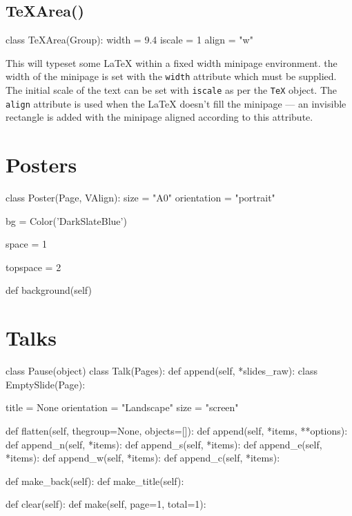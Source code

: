 \subsection{TeXArea()}
\begin{python}
class  TeXArea(Group):
    width = 9.4
    iscale = 1
    align = "w"
\end{python}
    
This will typeset some \LaTeX{} within a fixed width minipage environment.
the width of the minipage is set with the \Verb|width| attribute which must
be supplied. The initial scale of the text can be set with \Verb|iscale| as
per the \Verb|TeX| object. The \Verb|align| attribute is used when the
\LaTeX{} doesn't fill the minipage --- an invisible rectangle is added with
the minipage aligned according to this attribute.

\section{Posters}

\begin{python}
class Poster(Page, VAlign):
    size = "A0"
    orientation = "portrait"

    bg = Color('DarkSlateBlue')

    space = 1

    topspace = 2
	
    def background(self)
\end{python}


\section{Talks}


\begin{python}
class Pause(object)
class Talk(Pages):
    def append(self, *slides_raw):
class EmptySlide(Page):

    title = None
    orientation = "Landscape"
    size = "screen"

    def flatten(self, thegroup=None, objects=[]):
    def append(self, *items, **options):
    def append_n(self, *items):
    def append_s(self, *items):
    def append_e(self, *items):
    def append_w(self, *items):
    def append_c(self, *items):

    def make_back(self):
    def make_title(self):

	def clear(self):
    def make(self, page=1, total=1):
\end{python}

